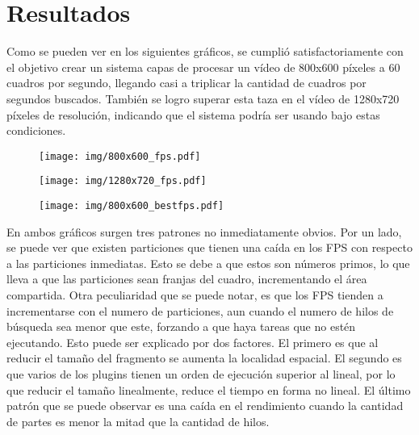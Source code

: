 \section{Resultados}

Como se pueden ver en los siguientes gráficos, se cumplió satisfactoriamente con
el objetivo crear un sistema capas de procesar un vídeo de 800x600 píxeles a 60
cuadros por segundo, llegando casi a triplicar la cantidad de cuadros por
segundos buscados. También se logro superar esta taza en el vídeo de 1280x720
píxeles de resolución, indicando que el sistema podría ser usando bajo estas
condiciones.

\begin{figure}[h]

	\texttt{[image: img/800x600\_fps.pdf]}
	\caption{}

\end{figure}

\begin{figure}[h]

	\texttt{[image: img/1280x720\_fps.pdf]}
	\caption{}

\end{figure}

\begin{figure}[h]

	\texttt{[image: img/800x600\_bestfps.pdf]}
	\caption{}

\end{figure}

En ambos gráficos surgen tres patrones no inmediatamente obvios. Por un lado, se
puede ver que existen particiones que tienen una caída en los FPS con respecto a
las particiones inmediatas. Esto se debe a que estos son números primos, lo que
lleva a que las particiones sean franjas del cuadro, incrementando el área
compartida. Otra peculiaridad que se puede notar, es que los FPS tienden a
incrementarse con el numero de particiones, aun cuando el numero de hilos de
búsqueda sea menor que este, forzando a que haya tareas que no estén ejecutando.
Esto puede ser explicado por dos factores. El primero es que al reducir el
tamaño del fragmento se aumenta la localidad espacial. El segundo es que varios
de los plugins tienen un orden de ejecución superior al lineal, por lo que
reducir el tamaño linealmente, reduce el tiempo en forma no lineal. El último
patrón que se puede observar es una caída en el rendimiento cuando la cantidad
de partes es menor la mitad que la cantidad de hilos.

